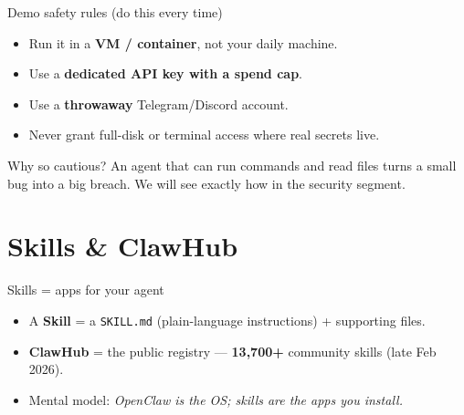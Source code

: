 \documentclass[aspectratio=169,11pt]{beamer}
\begin{document}
\begin{frame}{Demo safety rules (do this every time)}
  \begin{itemize}
    \item Run it in a \textbf{VM / container}, not your daily machine.
    \item Use a \textbf{dedicated API key with a spend cap}.
    \item Use a \textbf{throwaway} Telegram/Discord account.
    \item \alert{Never} grant full-disk or terminal access where real secrets live.
  \end{itemize}
  \vspace{1em}
  \begin{block}{Why so cautious?}
    An agent that can run commands and read files turns a small bug into a
    big breach. We will see exactly how in the security segment.
  \end{block}
\end{frame}

\section{Skills \& ClawHub}

\begin{frame}{Skills = apps for your agent}
  \begin{itemize}
    \item A \textbf{Skill} = a \texttt{SKILL.md} (plain-language instructions) + supporting files.
    \item \textbf{ClawHub} = the public registry — \textbf{13{,}700+} community skills (late Feb 2026).
    \item Mental model: \emph{OpenClaw is the OS; skills are the apps you install.}
  \end{itemize}
  \vspace{0.8em}
  \begin{center}
  \end{center}
\end{frame}
\end{document}
